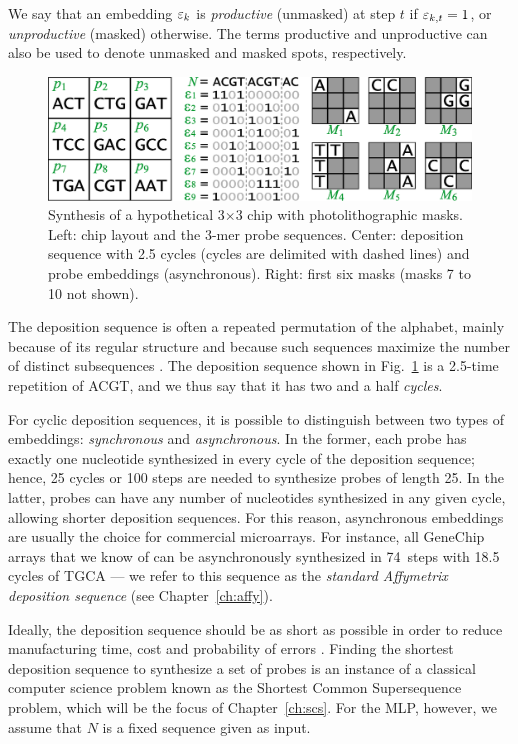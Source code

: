 We say that an embedding $\varepsilon_k$ is \emph{productive} (unmasked) at step $t$ if
$\varepsilon_{k,t} = 1$, or \emph{unproductive} (masked) otherwise. The terms
productive and unproductive can also be used to denote unmasked and masked
spots, respectively.

\begin{figure}
\centerline{\includegraphics[width=\textwidth]{figures/chip.eps}}
\caption{Synthesis of a hypothetical 3$\times$3 chip with photolithographic
  masks. Left: chip layout and the 3-mer probe sequences. Center: deposition
  sequence with 2.5 cycles (cycles are delimited with dashed lines) and probe
  embeddings (asynchronous). Right: first six masks (masks 7 to 10 not shown).}
\label{fig:masking_process}
\end{figure}

The deposition sequence is often a repeated permutation of the alphabet, mainly
because of its regular structure and because such sequences maximize the number
of distinct subsequences \citep{Chase1976}. The deposition sequence shown in
Fig.~\ref{fig:masking_process} is a 2.5-time repetition of ACGT, and we thus say
that it has two and a half \emph{cycles}.

For cyclic deposition sequences, it is possible to distinguish between two types
of embeddings: \emph{synchronous} and \emph{asynchronous}. In the former, each
probe has exactly one nucleotide synthesized in every cycle of the deposition
sequence; hence, 25 cycles or 100 steps are needed to synthesize probes of
length 25. In the latter, probes can have any number of nucleotides synthesized
in any given cycle, allowing shorter deposition sequences. For this reason,
asynchronous embeddings are usually the choice for commercial microarrays.  For
instance, all GeneChip arrays that we know of can be asynchronously synthesized
in 74~steps with 18.5 cycles of TGCA --- we refer to this sequence as the
\emph{standard Affymetrix deposition sequence} (see Chapter~\ref{ch:affy}).

Ideally, the deposition sequence should be as short as possible in order to
reduce manufacturing time, cost and probability of errors \citep{Rahmann2003}.
Finding the shortest deposition sequence to synthesize a set of probes is an
instance of a classical computer science problem known as the Shortest Common
Supersequence problem, which will be the focus of Chapter~\ref{ch:scs}. For the
MLP, however, we assume that $N$ is a fixed sequence given as input.

